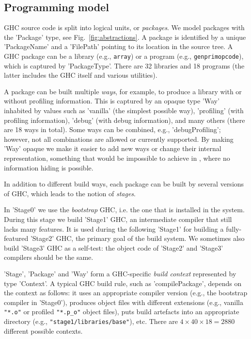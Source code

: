 \subsection{Programming model}

GHC source code is split into logical units, or \emph{packages}. We model
packages with the \lst'Package' type, see Fig.~\ref{fig:abstractions}. A
package is identified by a unique \lst'PackageName' and a \lst'FilePath'
pointing to its location in the source tree. A GHC package can be a library
(e.g., \texttt{array}) or a program (e.g., \texttt{genprimopcode}), which
is captured by \lst'PackageType'. There are 32 libraries and 18 programs
(the latter includes the GHC itself and various utilities).

A package can be built multiple \emph{ways}, for example, to produce a library
with or without profiling information. This is captured by an opaque
type \lst'Way' inhabited by values such as \lst'vanilla' (the simplest
possible way), \lst'profiling' (with profiling information), \lst'debug'
(with debug information), and many others (there are 18 ways in total). Some
ways can be combined, e.g., \lst'debugProfiling'; however, not all combinations
are allowed or currently supported. By making \lst'Way' opaque we make it easier
to add new ways or change their internal representation, something that would be
impossible to achieve in \make{}, where no information hiding is possible. 

In addition to different build ways, each package can be built by several
versions of GHC, which leads to the notion of \emph{stages}.

In \lst'Stage0' we use the \emph{bootstrap} GHC, i.e. the one that is
installed in the system. During this stage we build \lst'Stage1' GHC, an
intermediate compiler that still lacks many features. It is used during the
following \lst'Stage1' for building a fully-featured \lst'Stage2' GHC, the
primary goal of the build system. We sometimes also build \lst'Stage3' GHC as
a self-test: the object code of \lst'Stage2' and \lst'Stage3' compilers
should be the same.

\lst'Stage', \lst'Package' and \lst'Way' form a GHC-specific
\emph{build context} represented by type \lst'Context'. A typical GHC build
rule, such as \lst'compilePackage', depends on the context as follows: it
uses an appropriate compiler version (e.g., the bootstrap compiler in
\lst'Stage0'), produces object files with different extensions (e.g., vanilla
\texttt{"*.o"} or profiled \texttt{"*.p\_o"} object files), puts build artefacts
into an appropriate directory (e.g., \texttt{"stage1/libraries/base"}), etc.
There are $4 \times 40 \times 18 = 2880$ different possible contexts.

